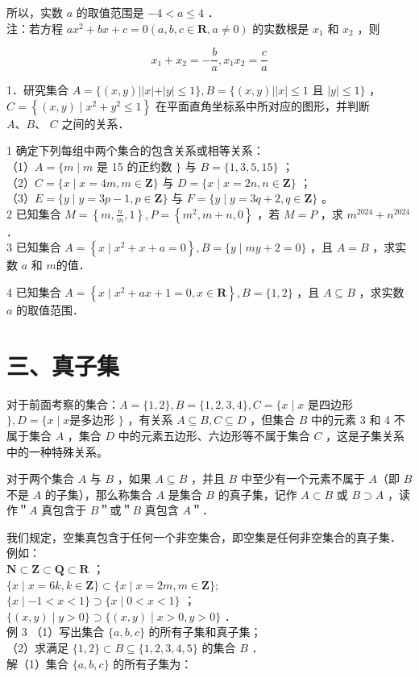 \documentclass[10pt]{article}
\begin{document}
所以，实数 \(a\) 的取值范围是 \(-4<a \leqslant 4\) ．\\
注：若方程 \(a x^{2}+b x+c=0(a, b, c \in \mathbf{R}, a \neq 0)\) 的实数根是 \(x_{1}\) 和 \(x_{2}\) ，则

\[
x_{1}+x_{2}=-\frac{b}{a}, x_{1} x_{2}=\frac{c}{a}
\]

1．研究集合 \(A=\{(x, y)| | x|+|y| \leqslant 1\}, B=\{(x, y)| | x \mid \leqslant 1\) 且 \(|y| \leqslant 1\}\) ， \(C=\left\{(x, y) \mid x^{2}+y^{2} \leqslant 1\right\}\) 在平面直角坐标系中所对应的图形，并判断 \(A 、 B 、\) \(C\) 之间的关系．

1 确定下列每组中两个集合的包含关系或相等关系：\\
（1）\(A=\{m \mid m\) 是 15 的正约数 \(\}\) 与 \(B=\{1,3,5,15\}\) ；\\
（2）\(C=\{x \mid x=4 m, m \in \mathbf{Z}\}\) 与 \(D=\{x \mid x=2 n, n \in \mathbf{Z}\}\) ；\\
（3）\(E=\{y \mid y=3 p-1, p \in \mathbf{Z}\}\) 与 \(F=\{y \mid y=3 q+2, q \in \mathbf{Z}\}\) 。\\
2 已知集合 \(M=\left\{m, \frac{n}{m}, 1\right\}, P=\left\{m^{2}, m+n, 0\right\}\) ，若 \(M=P\) ，求 \(m^{2024}+n^{2024}\) ．\\
3 已知集合 \(A=\left\{x \mid x^{2}+x+a=0\right\}, B=\{y \mid m y+2=0\}\) ，且 \(A=B\) ，求实数 \(a\) 和 \(m\)的值．

4 已知集合 \(A=\left\{x \mid x^{2}+a x+1=0, x \in \mathbf{R}\right\}, B=\{1,2\}\) ，且 \(A \subseteq B\) ，求实数 \(a\) 的取值范围．

\section*{三、真子集}
对于前面考察的集合：\(A=\{1,2\}, B=\{1,2,3,4\}, C=\{x \mid x\) 是四边形 \(\}, D=\{x \mid x\)是多边形 \(\}\) ，有关系 \(A \subseteq B, C \subseteq D\) ，但集合 \(B\) 中的元素 3 和 4 不属于集合 \(A\) ，集合 \(D\) 中的元素五边形、六边形等不属于集合 \(C\) ，这是子集关系中的一种特殊关系。

对于两个集合 \(A\) 与 \(B\) ，如果 \(A \subseteq B\) ，并且 \(B\) 中至少有一个元素不属于 \(A\)（即 \(B\) 不是 \(A\) 的子集），那么称集合 \(A\) 是集合 \(B\) 的真子集，记作 \(A \subset B\) 或 \(B \supset A\) ，读作＂\(A\) 真包含于 \(B\)＂或＂\(B\) 真包含 \(A\)＂．

我们规定，空集真包含于任何一个非空集合，即空集是任何非空集合的真子集．\\
例如：\\
\(\mathbf{N} \subset \mathbf{Z} \subset \mathbf{Q} \subset \mathbf{R}\) ；\\
\(\{x \mid x=6 k, k \in \mathbf{Z}\} \subset\{x \mid x=2 m, m \in \mathbf{Z}\} ;\)\\
\(\{x \mid-1<x<1\} \supset\{x \mid 0<x<1\}\) ；\\
\(\{(x, y) \mid y>0\} \supset\{(x, y) \mid x>0, y>0\}\) ．\\
例 3 （1）写出集合 \(\{a, b, c\}\) 的所有子集和真子集；\\
（2）求满足 \(\{1,2\} \subset B \subseteq\{1,2,3,4,5\}\) 的集合 \(B\) ．\\
解（1）集合 \(\{a, b, c\}\) 的所有子集为：
\end{document}
